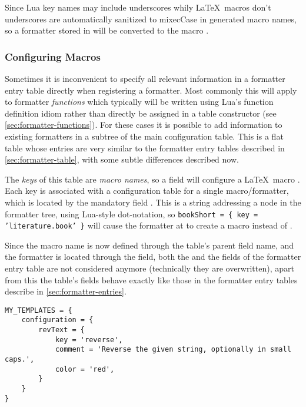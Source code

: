 \documentclass{scrartcl}
\begin{document}
Since Lua key names may include underscores whily \LaTeX\ macros don't
underscores are automatically sanitized to mixecCase in generated macro names,
so a formatter stored in  will be converted to the macro
.


\subsubsection{Configuring Macros}
\label{sec:configuring-macros}

Sometimes it is inconvenient to specify all relevant information in a formatter
entry table directly when registering a formatter.  Most commonly this will
apply to formatter \emph{functions} which typically will be written using Lua's
function definition idiom rather than directly be assigned in a table
constructor (see \vref{sec:formatter-functions}).  For these cases it is
possible to add information to existing formatters in a 
subtree of the main configuration table.  This is a flat table whose entries are
very similar to the formatter entry tables described in
\vref{sec:formatter-table}, with some subtle differences described
now.

The \emph{keys} of this table are \emph{macro names}, so a field
 will configure a \LaTeX\ macro
.
Each key is associated with a configuration table for a single macro/formatter,
which is located by the mandatory field .  This is a string
addressing a node in the formatter tree, using Lua-style dot-notation, so
\texttt{bookShort = \{ key = 'literature.book' \}} will cause the formatter at
 to create a macro  instead of
.

Since the macro name is now defined through the table's parent field name, and
the formatter is located through the  field, both the  and
the  fields of the formatter entry table are not considered anymore
(technically they are overwritten), apart from this the table's fields  behave
exactly like those in the formatter entry tables describe in
\vref{sec:formatter-entries}.

\begin{verbatim}
MY_TEMPLATES = {
    configuration = {
        revText = {
            key = 'reverse',
            comment = 'Reverse the given string, optionally in small caps.',
            color = 'red',
        }
    }
}
\end{verbatim}
\end{document}
